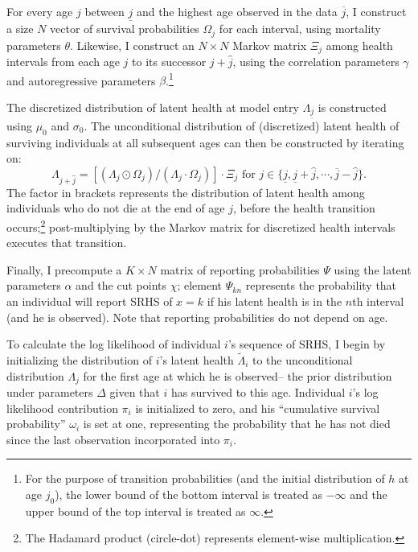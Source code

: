 \documentclass[12pt,pdftex,letterpaper]{article}
\newcommand{\Health}{h}
\newcommand{\Report}{x}
\newcommand{\Age}{j}
\newcommand{\AgeMin}{\underline{\Age}}
\newcommand{\AgeMax}{\overline{\Age}}
\newcommand{\AgeIncr}{\hat{\Age}}
\newcommand{\HealthInitMean}{\mu_0}
\newcommand{\HealthInitStd}{\sigma_0}
\newcommand{\Cut}{\chi}
\newcommand{\MortParam}{\theta}
\newcommand{\CorrParam}{\gamma}
\newcommand{\HealthParam}{\beta}
\newcommand{\LatentParam}{\alpha}
\newcommand{\ParamVec}{\Delta}
\newcommand{\LivPrb}{\Omega}
\newcommand{\CumLivPrb}{\omega}
\newcommand{\TransPrb}{\Xi}
\newcommand{\HealthDstn}{\Lambda}
\newcommand{\ReportPrb}{\Psi}
\newcommand{\HealthDstnPcvd}{\widetilde{\Lambda}}
\newcommand{\LL}{\pi}
\begin{document}
For every age $\Age$ between $\AgeMin$ and the highest age observed in the data $\AgeMax$, I construct a size $N$ vector of survival probabilities $\LivPrb_\Age$ for each interval, using mortality parameters $\MortParam$.  Likewise, I construct an $N \times N$ Markov matrix $\TransPrb_\Age$ among health intervals from each age $\Age$ to its successor $\Age + \AgeIncr$, using the correlation parameters $\CorrParam$ and autoregressive parameters $\HealthParam$.\footnote{For the purpose of transition probabilities (and the initial distribution of $\Health$ at age $\Age_0$), the lower bound of the bottom interval is treated as $-\infty$ and the upper bound of the top interval is treated as $\infty$.}  

The discretized distribution of latent health at model entry $\HealthDstn_{\AgeMin}$ is constructed using $\HealthInitMean$ and $\HealthInitStd$.  The unconditional distribution of (discretized) latent health of surviving individuals at all subsequent ages can then be constructed by iterating on:
\begin{equation}
\HealthDstn_{\Age + \AgeIncr} = \left[ (\HealthDstn_{\Age} \odot \LivPrb_\Age) / (\HealthDstn_{\Age} \cdot \LivPrb_\Age) \right] \cdot \TransPrb_{\Age} \text{ for } \Age \in \{\AgeMin, \AgeMin+\AgeIncr, \cdots, \AgeMax-\AgeIncr\}.
\end{equation}
The factor in brackets represents the distribution of latent health among individuals who do not die at the end of age $\Age$, before the health transition occurs;\footnote{The Hadamard product (circle-dot) represents element-wise multiplication.} post-multiplying by the Markov matrix for discretized health intervals executes that transition.

Finally, I precompute a $K \times N$ matrix of reporting probabilities $\ReportPrb$ using the latent parameters $\LatentParam$ and the cut points $\Cut$; element $\ReportPrb_{kn}$ represents the probability that an individual will report SRHS of $\Report=k$ if his latent health is in the $n$th interval (and he is observed).  Note that reporting probabilities do not depend on age.

To calculate the log likelihood of individual $i$'s sequence of SRHS, I begin by initializing the distribution of $i$'s latent health $\HealthDstnPcvd_{i}$ to the unconditional distribution $\HealthDstn_{\Age}$ for the first age at which he is observed-- the prior distribution under parameters $\ParamVec$ given that $i$ has survived to this age.  Individual $i$'s log likelihood contribution $\LL_i$ is initialized to zero, and his ``cumulative survival probability'' $\CumLivPrb_i$ is set at one, representing the probability that he has not died since the last observation incorporated into $\LL_i$.
\end{document}
